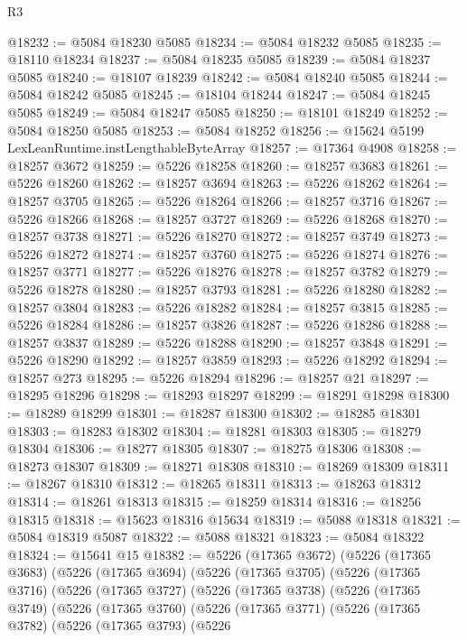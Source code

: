 \begin{lexlean}{R3}
\begin{coremodule}
@18232 := @5084 @18230 @5085
@18234 := @5084 @18232 @5085
@18235 := @18110 @18234
@18237 := @5084 @18235 @5085
@18239 := @5084 @18237 @5085
@18240 := @18107 @18239
@18242 := @5084 @18240 @5085
@18244 := @5084 @18242 @5085
@18245 := @18104 @18244
@18247 := @5084 @18245 @5085
@18249 := @5084 @18247 @5085
@18250 := @18101 @18249
@18252 := @5084 @18250 @5085
@18253 := @5084 @18252
@18256 := @15624 @5199 LexLeanRuntime.instLengthableByteArray
@18257 := @17364 @4908
@18258 := @18257 @3672
@18259 := @5226 @18258
@18260 := @18257 @3683
@18261 := @5226 @18260
@18262 := @18257 @3694
@18263 := @5226 @18262
@18264 := @18257 @3705
@18265 := @5226 @18264
@18266 := @18257 @3716
@18267 := @5226 @18266
@18268 := @18257 @3727
@18269 := @5226 @18268
@18270 := @18257 @3738
@18271 := @5226 @18270
@18272 := @18257 @3749
@18273 := @5226 @18272
@18274 := @18257 @3760
@18275 := @5226 @18274
@18276 := @18257 @3771
@18277 := @5226 @18276
@18278 := @18257 @3782
@18279 := @5226 @18278
@18280 := @18257 @3793
@18281 := @5226 @18280
@18282 := @18257 @3804
@18283 := @5226 @18282
@18284 := @18257 @3815
@18285 := @5226 @18284
@18286 := @18257 @3826
@18287 := @5226 @18286
@18288 := @18257 @3837
@18289 := @5226 @18288
@18290 := @18257 @3848
@18291 := @5226 @18290
@18292 := @18257 @3859
@18293 := @5226 @18292
@18294 := @18257 @273
@18295 := @5226 @18294
@18296 := @18257 @21
@18297 := @18295 @18296
@18298 := @18293 @18297
@18299 := @18291 @18298
@18300 := @18289 @18299
@18301 := @18287 @18300
@18302 := @18285 @18301
@18303 := @18283 @18302
@18304 := @18281 @18303
@18305 := @18279 @18304
@18306 := @18277 @18305
@18307 := @18275 @18306
@18308 := @18273 @18307
@18309 := @18271 @18308
@18310 := @18269 @18309
@18311 := @18267 @18310
@18312 := @18265 @18311
@18313 := @18263 @18312
@18314 := @18261 @18313
@18315 := @18259 @18314
@18316 := @18256 @18315
@18318 := @15623 @18316 @15634
@18319 := @5088 @18318
@18321 := @5084 @18319 @5087
@18322 := @5088 @18321
@18323 := @5084 @18322
@18324 := @15641 @15
@18382 := @5226
    (@17365 @3672)
    (@5226
      (@17365 @3683)
      (@5226
        (@17365 @3694)
        (@5226
          (@17365 @3705)
          (@5226
            (@17365 @3716)
            (@5226
              (@17365 @3727)
              (@5226
                (@17365 @3738)
                (@5226
                  (@17365 @3749)
                  (@5226
                    (@17365 @3760)
                    (@5226
                      (@17365 @3771)
                      (@5226
                        (@17365 @3782)
                        (@5226
                          (@17365 @3793)
                          (@5226

\end{coremodule}
\end{lexlean}
